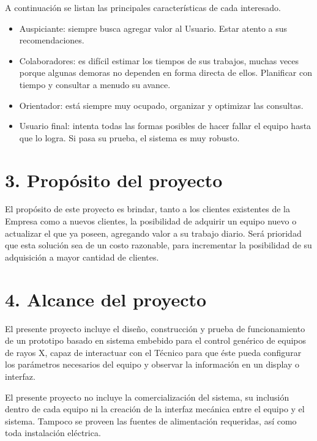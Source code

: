 \documentclass[
11pt, %
]{charter}
\begin{document}

A continuación se listan las principales características de cada interesado.
 
\begin{itemize}
	\item Auspiciante: siempre busca agregar valor al Usuario. Estar atento a sus recomendaciones.
	\item Colaboradores: es difícil estimar los tiempos de sus trabajos, muchas veces porque algunas demoras no dependen en forma directa de ellos. Planificar con tiempo y consultar a menudo su avance.
	\item Orientador: está siempre muy ocupado, organizar y optimizar las consultas.
	\item Usuario final: intenta todas las formas posibles de hacer fallar el equipo hasta que lo logra. Si pasa su prueba, el sistema es muy robusto.
\end{itemize}


\section{3. Propósito del proyecto}
\label{sec:proposito}

El propósito de este proyecto es brindar, tanto a los clientes existentes de la Empresa como a nuevos clientes, la posibilidad de adquirir un equipo nuevo o actualizar el que ya poseen, agregando valor a su trabajo diario. Será prioridad que esta solución sea de un costo razonable, para incrementar la posibilidad de su adquisición a mayor cantidad de clientes. 

\section{4. Alcance del proyecto}
\label{sec:alcance}

El presente proyecto incluye el diseño, construcción y prueba de funcionamiento de un prototipo basado en sistema embebido para el control genérico de equipos de rayos X, capaz de interactuar con el Técnico para que éste pueda configurar los parámetros necesarios del equipo y observar la información en un display o interfaz. 

El presente proyecto no incluye la comercialización del sistema, su inclusión dentro de cada equipo ni la creación de la interfaz mecánica entre el equipo y el sistema. Tampoco se proveen las fuentes de alimentación requeridas, así como toda instalación eléctrica. 
\end{document}
